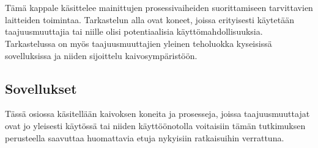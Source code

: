 \documentclass[finnish,12pt,a4paper,pdftex,elec,utf8]{aaltothesis}
\begin{document}
\\\\
Tämä kappale käsittelee mainittujen prosessivaiheiden suorittamiseen tarvittavien laitteiden toimintaa. Tarkastelun alla ovat koneet, joissa erityisesti käytetään taajuusmuuttajia tai niille olisi potentiaalisia käyttömahdollisuuksia. Tarkastelussa on myös taajuusmuuttajien yleinen teholuokka kyseisissä sovelluksissa ja niiden sijoittelu kaivosympäristöön.




\subsection{Sovellukset}
Tässä osiossa käsitellään kaivoksen koneita ja prosesseja, joissa taajuusmuuttajat ovat jo yleisesti käytössä tai niiden käyttöönotolla voitaisiin tämän tutkimuksen perusteella saavuttaa huomattavia etuja nykyisiin ratkaisuihin verrattuna.
\end{document}
